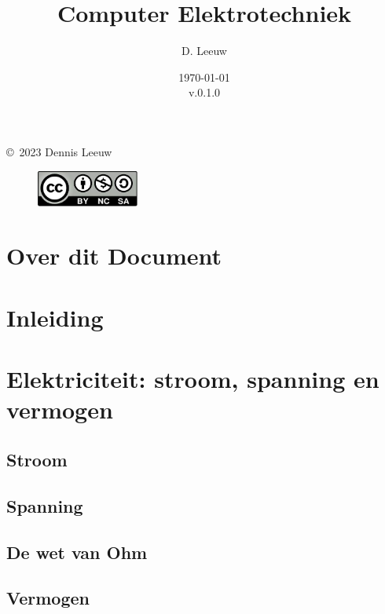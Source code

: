 \documentclass[a4paper,12pt,twoside,openright,titlepage]{book}
\author{D. Leeuw}
\title{Computer Elektrotechniek}
\date{\today\\v.0.1.0}
\begin{document}

\maketitle

\copyright\ 2023 Dennis Leeuw\\

\begin{figure}
\includegraphics[width=0.3\textwidth]{CC-BY-SA-NC.png}
\end{figure}

\bigskip




\frontmatter
\chapter{Over dit Document}



\tableofcontents

\mainmatter
\chapter{Inleiding}


\chapter{Elektriciteit: stroom, spanning en vermogen}

\section{Stroom}

\section{Spanning}

\section{De wet van Ohm}

\section{Vermogen}

\end{document}
